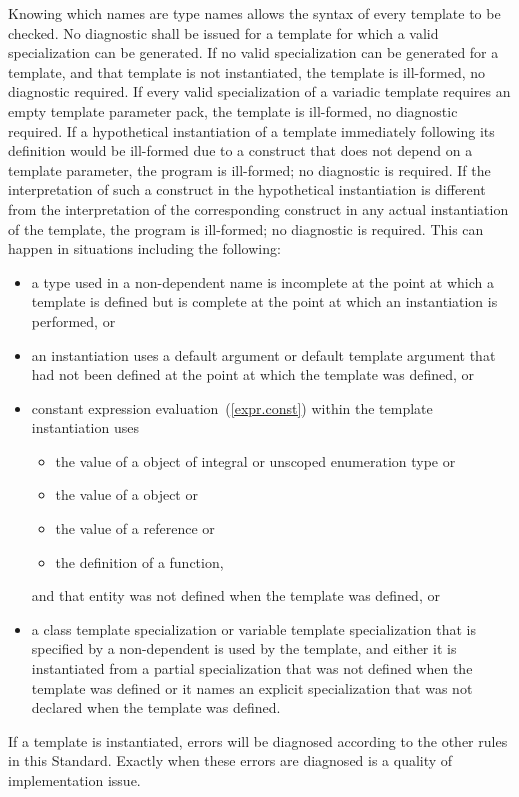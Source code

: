 \pnum
{}%
%
Knowing which names are type names allows the syntax of every template
to be checked.
No diagnostic shall be issued for a template
for which a valid specialization can be generated.
If no valid specialization can be generated
for a template,
and that template is not instantiated, the template is ill-formed,
no diagnostic required.
If every valid specialization of a variadic template requires an empty template
parameter pack, the template is ill-formed, no diagnostic required.
If a hypothetical instantiation of a template
immediately following its definition
would be ill-formed
due to a construct that does not depend on a template parameter,
the program is ill-formed; no diagnostic is required.
If the interpretation of such a construct
in the hypothetical instantiation
is different from
the interpretation of the corresponding construct
in any actual instantiation of the template,
the program is ill-formed; no diagnostic is required.
\enternote
This can happen in situations including the following:
\begin{itemize}
\item a type used in a non-dependent name is incomplete at the point at which a
template is defined but is complete at the point at which an instantiation is
performed, or

\item an instantiation uses a default argument or default template argument
that had not been defined at the point at which the template was defined, or

\item constant expression evaluation~(\ref{expr.const}) within the template
instantiation uses
  \begin{itemize}
  \item the value of a  object of integral or unscoped enumeration type or
  \item the value of a  object or
  \item the value of a reference or
  \item the definition of a  function,
  \end{itemize}
and that entity was not defined when the template was defined, or

\item a class template specialization or variable template specialization that
is specified by a non-dependent  is used by
the template, and either it is instantiated from a partial specialization that
was not defined when the template was defined or it names an explicit
specialization that was not declared when the template was defined.
\end{itemize}
\exitnote
\enternote
If a template is instantiated, errors will be diagnosed according
to the other rules in this Standard.
Exactly when these errors are diagnosed is a quality of implementation issue.
\exitnote
\enterexample


